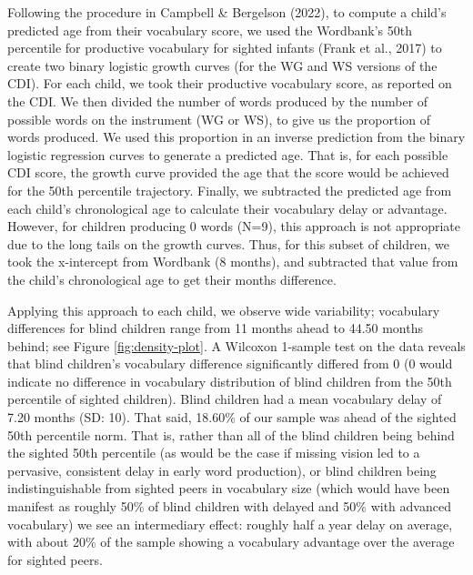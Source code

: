 \documentclass[english,man,floatsintext]{apa6}
\begin{document}
Following the procedure in Campbell \& Bergelson (2022), to compute a child's predicted age from their vocabulary score, we used the Wordbank's 50th percentile for productive vocabulary for sighted infants (Frank et al., 2017) to create two binary logistic growth curves (for the WG and WS versions of the CDI). For each child, we took their productive vocabulary score, as reported on the CDI. We then divided the number of words produced by the number of possible words on the instrument (WG or WS), to give us the proportion of words produced. We used this proportion in an inverse prediction from the binary logistic regression curves to generate a predicted age. That is, for each possible CDI score, the growth curve provided the age that the score would be achieved for the 50th percentile trajectory. Finally, we subtracted the predicted age from each child's chronological age to calculate their vocabulary delay or advantage. However, for children producing 0 words (N=9), this approach is not appropriate due to the long tails on the growth curves. Thus, for this subset of children, we took the x-intercept from Wordbank (8 months), and subtracted that value from the child's chronological age to get their months difference.

Applying this approach to each child, we observe wide variability; vocabulary differences for blind children range from 11 months ahead to 44.50 months behind; see Figure \ref{fig:density-plot}. A Wilcoxon 1-sample test on the data reveals that blind children's vocabulary difference significantly differed from 0 (0 would indicate no difference in vocabulary distribution of blind children from the 50th percentile of sighted children). Blind children had a mean vocabulary delay of 7.20 months (SD: 10). That said, 18.60\% of our sample was ahead of the sighted 50th percentile norm. That is, rather than all of the blind children being behind the sighted 50th percentile (as would be the case if missing vision led to a pervasive, consistent delay in early word production), or blind children being indistinguishable from sighted peers in vocabulary size (which would have been manifest as roughly 50\% of blind children with delayed and 50\% with advanced vocabulary) we see an intermediary effect: roughly half a year delay on average, with about 20\% of the sample showing a vocabulary advantage over the average for sighted peers.
\end{document}
